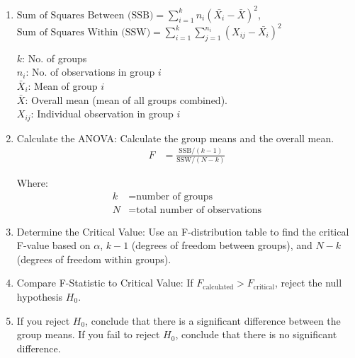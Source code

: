 \documentclass[letterpaper, 10.5pt,landscape]{article}
\begin{document}
\begin{multicols*}{3}
\begin{enumerate}
    \item \(\text{Sum of Squares Between (SSB)} = \sum_{i=1}^{k} n_i (\bar{X_i} - \bar{X})^2\), \quad
    \(\text{Sum of Squares Within (SSW)} = \sum_{i=1}^{k} \sum_{j=1}^{n_i} (X_{ij} - \bar{X_i})^2 \)

$k$: No. of groups \\
$n_{i}$: No. of observations in group $i$ \\
$\bar{X}_{i}$: Mean of group $i$ \\
$\bar{X}$: Overall mean (mean of all groups combined). \\
$X_{ij}$: Individual observation in group $i$



    \vspace{-2pt}
    \item  Calculate the ANOVA: Calculate the group means and the overall mean.
    \vspace{-2pt}
    \begin{align*}
    F &= \frac{\text{SSB} / (k - 1)}{\text{SSW} / (N - k)}
    \end{align*}
    \vspace{-2pt}

    Where:
    \vspace{-2pt}
    \begin{align*}
        k & = \text{number of groups} \\
        N & = \text{total number of observations}
    \end{align*}
    \vspace{-2pt}


    \item  Determine the Critical Value: 
Use an F-distribution table to find the critical F-value based on $\alpha$, $k - 1$ (degrees of freedom between groups), and $N - k$ (degrees of freedom within groups).
\vspace{-2pt}


    \item Compare F-Statistic to Critical Value:
If $F_{\text{calculated}} > F_{\text{critical}}$, reject the null hypothesis $H_0$.
\vspace{-2pt}

    \item If you reject $H_0$, conclude that there is a significant difference between the group means. If you fail to reject $H_0$, conclude that there is no significant difference.
    \vspace{-2pt}
\end{enumerate}














\end{multicols*}
\end{document}
